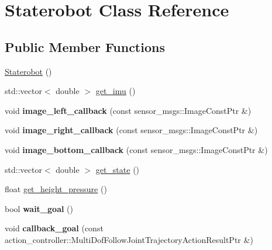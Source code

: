 \hypertarget{class_staterobot}{\section{\-Staterobot \-Class \-Reference}
\label{class_staterobot}
}
\subsection*{\-Public \-Member \-Functions}
\begin{DoxyCompactItemize}
\item 
\hyperlink{class_staterobot_ab99a92f98d724c96989a744aee273155}{\-Staterobot} ()
\item 
std\-::vector$<$ double $>$ \hyperlink{class_staterobot_a50e002ec81917b295a87463127648a52}{get\-\_\-imu} ()
\item 
\hypertarget{class_staterobot_a4cb41f60186d02b210f354d0199584a4}{void {\bfseries image\-\_\-left\-\_\-callback} (const sensor\-\_\-msgs\-::\-Image\-Const\-Ptr \&)}\label{class_staterobot_a4cb41f60186d02b210f354d0199584a4}

\item 
\hypertarget{class_staterobot_af908b8a70811f3c0a48efe323610602d}{void {\bfseries image\-\_\-right\-\_\-callback} (const sensor\-\_\-msgs\-::\-Image\-Const\-Ptr \&)}\label{class_staterobot_af908b8a70811f3c0a48efe323610602d}

\item 
\hypertarget{class_staterobot_a8ad49fe9f855e5874d8736067fa7fac0}{void {\bfseries image\-\_\-bottom\-\_\-callback} (const sensor\-\_\-msgs\-::\-Image\-Const\-Ptr \&)}\label{class_staterobot_a8ad49fe9f855e5874d8736067fa7fac0}

\item 
std\-::vector$<$ double $>$ \hyperlink{class_staterobot_a51670cc44348eae6328f220421ea328f}{get\-\_\-state} ()
\item 
float \hyperlink{class_staterobot_a0318f7abf24c5c60aee915224af6af02}{get\-\_\-height\-\_\-pressure} ()
\item 
\hypertarget{class_staterobot_a4a44c24dd5cdb773aa40772d02b41720}{bool {\bfseries wait\-\_\-goal} ()}\label{class_staterobot_a4a44c24dd5cdb773aa40772d02b41720}

\item 
\hypertarget{class_staterobot_a37cbdfcb1cc30194f0fa0742952a0aad}{void {\bfseries callback\-\_\-goal} (const action\-\_\-controller\-::\-Multi\-Dof\-Follow\-Joint\-Trajectory\-Action\-Result\-Ptr \&)}\label{class_staterobot_a37cbdfcb1cc30194f0fa0742952a0aad}


\end{DoxyCompactItemize}
